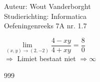 \documentclass[a4paper]{article}
\newcommand{\Limit}{\lim\limits_}
\begin{document}
  
\noindent \large Auteur: Wout Vanderborght\\
\noindent \large Studierichting: Informatica\\
\noindent \large Oefeningenreeks 7A nr. 1.7\\

\medskip

\normalsize

$ \Limit{(x, y) \rightarrow (2, -2)} \dfrac{4-xy}{4+xy} = \dfrac{8}{0} $ \\

$\Rightarrow$ Limiet bestaat niet $\Rightarrow \infty$ \\

\begin{thebibliography}{999}
\end{thebibliography}
\end{document}
